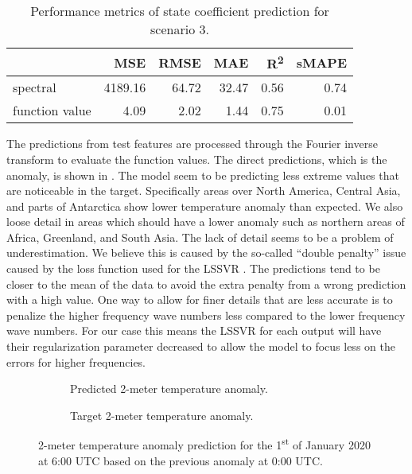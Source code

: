 \begin{table}[H]
  \caption{Performance metrics of state coefficient prediction for scenario 3.}\label{table:sc3_test_state_metrics}
  \centering
  \begin{tabular}{lrrrrr}
    \toprule
                   & MSE     & RMSE  & MAE   & R\textsuperscript{2}   & sMAPE \\
    \midrule
    spectral       & 4189.16 & 64.72 & 32.47 & 0.56 & 0.74  \\
    function value & 4.09    & 2.02  & 1.44  & 0.75 & 0.01  \\
    \bottomrule
  \end{tabular}
\end{table}

The predictions from test features are processed through the Fourier inverse transform to evaluate the function values. The direct predictions, which is the anomaly, is shown in . The model seem to be predicting less extreme values that are noticeable in the target. Specifically areas over North America, Central Asia, and parts of Antarctica show lower temperature anomaly than expected. We also loose detail in areas which should have a lower anomaly such as northern areas of Africa, Greenland, and South Asia. The lack of detail seems to be a problem of underestimation. We believe this is caused by the so-called \enquote{double penalty} issue caused by the loss function used for the LSSVR \autocite{lledoScaledependentVerificationPrecipitation2023}. The predictions tend to be closer to the mean of the data to avoid the extra penalty from a wrong prediction with a high value. One way to allow for finer details that are less accurate is to penalize the higher frequency wave numbers less compared to the lower frequency wave numbers. For our case this means the LSSVR for each output will have their regularization parameter decreased to allow the model to focus less on the errors for higher frequencies.
\begin{figure}[H]
  \centering
  \begin{subfigure}{\linewidth}
    \begin{adjustbox}{width=\linewidth}
      
    \end{adjustbox}
    \caption{Predicted 2-meter temperature anomaly.}\label{fig:sc3_anomaly_pred}
  \end{subfigure}
  \begin{subfigure}{\linewidth}
    \begin{adjustbox}{width=\linewidth}
      
    \end{adjustbox}
    \caption{Target 2-meter temperature anomaly.}\label{fig:sc3_anomaly_target}
  \end{subfigure}
  \caption{2-meter temperature anomaly prediction for the 1\textsuperscript{st} of January 2020 at 6:00 UTC based on the previous anomaly at 0:00 UTC.}\label{fig:sc3_anomaly_predictions}
\end{figure}

